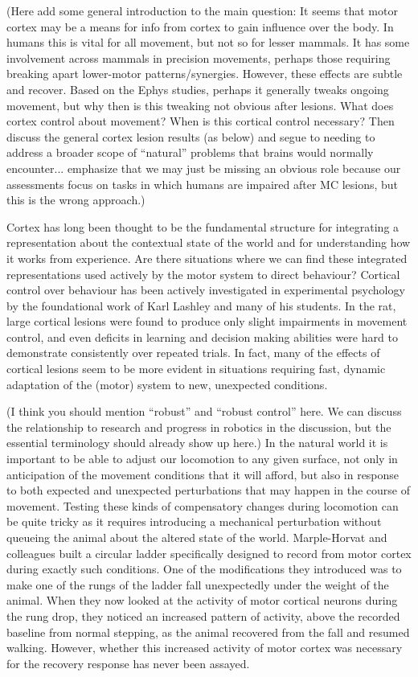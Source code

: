 (Here add some general introduction to the main question: It seems that motor cortex may be a means for info from cortex to gain influence over the body. In humans this is vital for all movement, but not so for lesser mammals. It has some involvement across mammals in precision movements, perhaps those requiring breaking apart lower-motor patterns/synergies. However, these effects are subtle and recover. Based on the Ephys studies, perhaps it generally tweaks ongoing movement, but why then is this tweaking not obvious after lesions. What does cortex control about movement? When is this cortical control necessary? Then discuss the general cortex lesion results (as below) and segue to needing to address a broader scope of ``natural'' problems that brains would normally encounter... emphasize that we may just be missing an obvious role because our assessments focus on tasks in which humans are impaired after MC lesions, but this is the wrong approach.)


Cortex has long been thought to be the fundamental structure for integrating a representation about the contextual state of the world and for understanding how it works from experience. Are there situations where we can find these integrated representations used actively by the motor system to direct behaviour? Cortical control over behaviour has been actively investigated in experimental psychology by the foundational work of Karl Lashley and many of his students. In the rat, large cortical lesions were found to produce only slight impairments in movement control, and even deficits in learning and decision making abilities were hard to demonstrate consistently over repeated trials. In fact, many of the effects of cortical lesions seem to be more evident in situations requiring fast, dynamic adaptation of the (motor) system to new, unexpected conditions.

(I think you should mention ``robust'' and ``robust control'' here. We can discuss the relationship to research and progress in robotics in the discussion, but the essential terminology should already show up here.)
In the natural world it is important to be able to adjust our locomotion to any given surface, not only in anticipation of the movement conditions that it will afford, but also in response to both expected and unexpected perturbations that may happen in the course of movement. Testing these kinds of compensatory changes during locomotion can be quite tricky as it requires introducing a mechanical perturbation without queueing the animal about the altered state of the world. Marple-Horvat and colleagues built a circular ladder specifically designed to record from motor cortex during exactly such conditions. One of the modifications they introduced was to make one of the rungs of the ladder fall unexpectedly under the weight of the animal. When they now looked at the activity of motor cortical neurons during the rung drop, they noticed an increased pattern of activity, above the recorded baseline from normal stepping, as the animal recovered from the fall and resumed walking. However, whether this increased activity of motor cortex was necessary for the recovery response has never been assayed.


